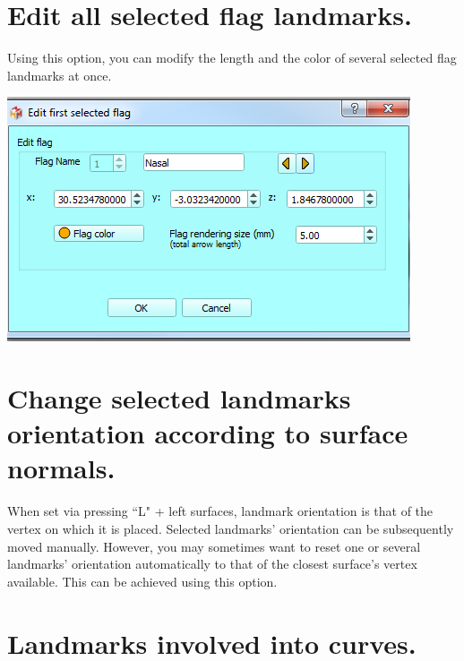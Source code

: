 \section{Edit all selected flag landmarks.}
\noindent
\begin{minipage}{0.5\textwidth}
Using this option, you can modify the length and the color
of several selected flag landmarks at once.
\end{minipage}    
\begin{minipage}{0.5\textwidth}\centering
  \includegraphics[scale=0.5]{images/Edit_selected_landmarks/Edit_flags.png}
 \end{minipage} 
\noindent





\section{Change selected landmarks orientation according to surface normals.}
When set via pressing ``L" + left surfaces, landmark orientation is that of the vertex on which it is
placed. Selected landmarks' orientation can be subsequently moved manually. However, you may
sometimes want to reset one or several landmarks' orientation automatically to that of the closest
surface's vertex available. This can be achieved using this option.



\section{Landmarks involved into curves.}\label{landmarks_curves_section}

